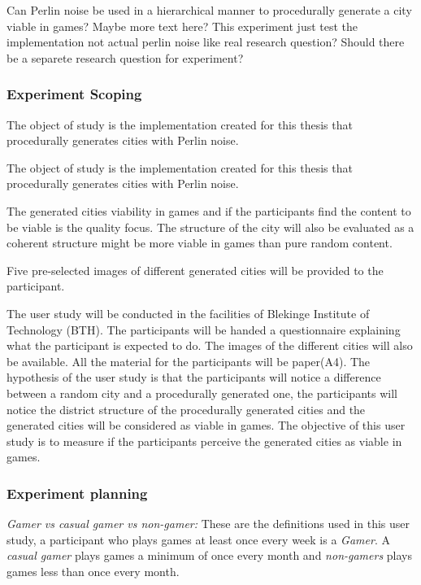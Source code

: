 			Can Perlin noise be used in a hierarchical manner to procedurally generate a city viable in games? Maybe more text here? This experiment just test the implementation not actual perlin noise like real research question? Should there be a separete research question for experiment?
		
		\subsubsection{Experiment Scoping}
		The object of study is the implementation created for this thesis that procedurally generates cities with Perlin noise.
		
		The object of study is the implementation created for this thesis that procedurally generates cities with Perlin noise.
		
		The generated cities viability in games and if the participants find the content to be viable is the quality focus. The structure of the city will also be evaluated as a coherent structure might be more viable in games than pure random content.
		
		Five pre-selected images of different generated cities will be provided to the participant.
		
		The user study will be conducted in the facilities of Blekinge Institute of Technology (BTH). The participants will be handed a questionnaire explaining what the participant is expected to do. The images of the different cities will also be available. All the material for the participants will be paper(A4).
		The hypothesis of the user study is that the participants will notice a difference between a random city and a procedurally generated one, the participants will notice the district structure of the procedurally generated cities and the generated cities will be considered as viable in games.
		The objective of this user study is to measure if the participants perceive the generated cities as viable in games.
	
	\subsubsection{Experiment planning}
		\textit{Gamer vs casual gamer vs non-gamer:} These are the definitions used in this user study, a participant who plays games at least once every week is a \textit{Gamer}. A \textit{casual gamer} plays games a minimum of once every month and \textit{non-gamers} plays games less than once every month. 
		
